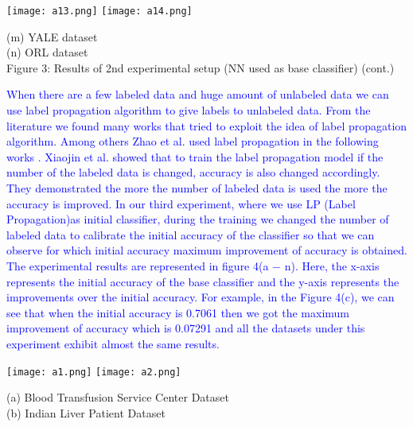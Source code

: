 \documentclass{article}
\begin{document}
		  
		  
		  
		  \newpage
		  \texttt{[image: a13.png]}
		  \texttt{[image: a14.png]}
		  \begin{center}
		  	\small (m) YALE dataset\\
		  	\vspace{0.5em}(n) ORL dataset\\
		  	\vspace{0.9em}
		  	Figure 3: Results of 2nd experimental setup (NN used as base classifier) (cont.)\\\vspace{0.5em}
		  \end{center}
		  
		  
		  
		  \textcolor{blue}{When there are a few labeled data and huge amount of unlabeled data we can use label propagation algorithm to give labels to unlabeled data. From the literature we found many works that tried to exploit the idea of label propagation algorithm. Among others Zhao et al. used label propagation in the following works \cite{slowinski2000scheduling,sowa2013source,wang1996interpretation}. Xiaojin et al. \cite{reinertsen1999taking}  showed that to train the label propagation model if the number of the labeled data is changed, accuracy is also changed accordingly. They demonstrated the more the number of labeled data is used the more the accuracy is improved. In our third experiment, where we use LP (Label Propagation)as initial classifier, during the training we changed the number of labeled data to calibrate the initial accuracy of the classifier so that we can observe for which initial accuracy maximum improvement of accuracy is obtained. The experimental results are represented in figure 4(a $-$ n). Here, the x-axis represents the initial accuracy of the base classifier and the y-axis represents the improvements over the initial accuracy. For example, in the Figure 4(c), we can see that when the initial accuracy is 0.7061 then we got the maximum improvement of accuracy which is 0.07291 and all the datasets under this experiment exhibit almost the same results.}
		  
		  
		  
		   \newpage
		  \texttt{[image: a1.png]}
		  \texttt{[image: a2.png]}
		  \begin{center}
		  	\small (a) Blood Transfusion Service Center Dataset\\
		  	\vspace{0.5em}(b) Indian Liver Patient Dataset
		  \end{center}
		  
\end{document}

